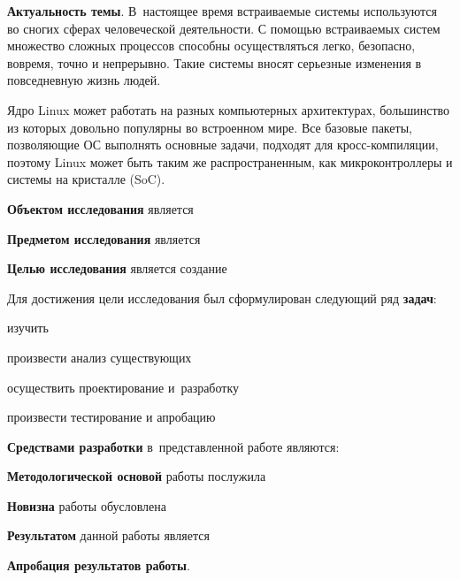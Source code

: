 
\textbf{Актуальность темы}. В~настоящее время встраиваемые системы используются во сногих сферах человеческой деятельности. С помощью встраиваемых систем множество сложных процессов способны осуществляться легко, безопасно, вовремя, точно и непрерывно. Такие системы вносят серьезные изменения в повседневную жизнь людей.

Ядро Linux может работать на разных компьютерных архитектурах, большинство из которых довольно популярны во встроенном мире. Все базовые пакеты, позволяющие ОС выполнять основные задачи, подходят для кросс-компиляции, поэтому Linux может быть таким же распространенным, как микроконтроллеры и системы на кристалле (SoC).

\textbf{Объектом исследования} является 

\textbf{Предметом исследования} является

\textbf{Целью исследования} является создание

Для достижения цели исследования был сформулирован следующий ряд \textbf{задач}:

\begin{dashitemize}
  \item изучить 
  \item произвести анализ существующих 
  \item осуществить проектирование и~разработку
  \item произвести тестирование и апробацию
\end{dashitemize}

\textbf{Средствами разработки} в~представленной работе являются: 

\textbf{Методологической основой} работы послужила 

\textbf{Новизна} работы обусловлена

\textbf{Результатом} данной работы является 

\textbf{Апробация результатов работы}.

\newpage
